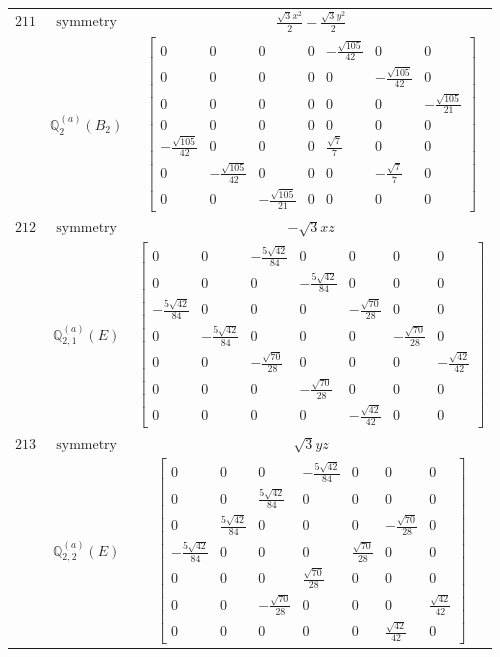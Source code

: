 \documentclass[fleqn,8pt,landscape]{jsarticle}
\begin{document}
\begin{longtable}{ccc}
$ 211 $ & $ \text{symmetry} $ & $ \frac{\sqrt{3} x^{2}}{2} - \frac{\sqrt{3} y^{2}}{2} $ \\
$  $ & $ \mathbb{Q}_{2}^{(a)}(B_{2}) $ & $ \begin{bmatrix} 0 & 0 & 0 & 0 & - \frac{\sqrt{105}}{42} & 0 & 0 \\ 0 & 0 & 0 & 0 & 0 & - \frac{\sqrt{105}}{42} & 0 \\ 0 & 0 & 0 & 0 & 0 & 0 & - \frac{\sqrt{105}}{21} \\ 0 & 0 & 0 & 0 & 0 & 0 & 0 \\ - \frac{\sqrt{105}}{42} & 0 & 0 & 0 & \frac{\sqrt{7}}{7} & 0 & 0 \\ 0 & - \frac{\sqrt{105}}{42} & 0 & 0 & 0 & - \frac{\sqrt{7}}{7} & 0 \\ 0 & 0 & - \frac{\sqrt{105}}{21} & 0 & 0 & 0 & 0 \end{bmatrix} $ \\ \hline
$ 212 $ & $ \text{symmetry} $ & $ - \sqrt{3} x z $ \\
$  $ & $ \mathbb{Q}_{2,1}^{(a)}(E) $ & $ \begin{bmatrix} 0 & 0 & - \frac{5 \sqrt{42}}{84} & 0 & 0 & 0 & 0 \\ 0 & 0 & 0 & - \frac{5 \sqrt{42}}{84} & 0 & 0 & 0 \\ - \frac{5 \sqrt{42}}{84} & 0 & 0 & 0 & - \frac{\sqrt{70}}{28} & 0 & 0 \\ 0 & - \frac{5 \sqrt{42}}{84} & 0 & 0 & 0 & - \frac{\sqrt{70}}{28} & 0 \\ 0 & 0 & - \frac{\sqrt{70}}{28} & 0 & 0 & 0 & - \frac{\sqrt{42}}{42} \\ 0 & 0 & 0 & - \frac{\sqrt{70}}{28} & 0 & 0 & 0 \\ 0 & 0 & 0 & 0 & - \frac{\sqrt{42}}{42} & 0 & 0 \end{bmatrix} $ \\ \hline
$ 213 $ & $ \text{symmetry} $ & $ \sqrt{3} y z $ \\
$  $ & $ \mathbb{Q}_{2,2}^{(a)}(E) $ & $ \begin{bmatrix} 0 & 0 & 0 & - \frac{5 \sqrt{42}}{84} & 0 & 0 & 0 \\ 0 & 0 & \frac{5 \sqrt{42}}{84} & 0 & 0 & 0 & 0 \\ 0 & \frac{5 \sqrt{42}}{84} & 0 & 0 & 0 & - \frac{\sqrt{70}}{28} & 0 \\ - \frac{5 \sqrt{42}}{84} & 0 & 0 & 0 & \frac{\sqrt{70}}{28} & 0 & 0 \\ 0 & 0 & 0 & \frac{\sqrt{70}}{28} & 0 & 0 & 0 \\ 0 & 0 & - \frac{\sqrt{70}}{28} & 0 & 0 & 0 & \frac{\sqrt{42}}{42} \\ 0 & 0 & 0 & 0 & 0 & \frac{\sqrt{42}}{42} & 0 \end{bmatrix} $ \\ \hline

\end{longtable}
\end{document}
